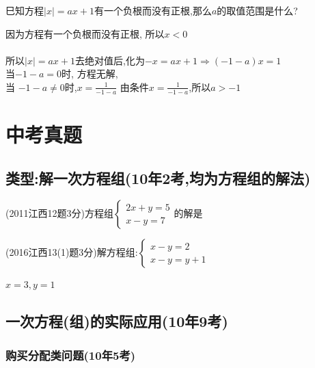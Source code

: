 \documentclass[cn,blue,12pt]{elegantbook}
\renewcommand \tkt[1]{{\CJKunderline[hidden=true, skip=true, thickness=1pt]{#1}}}
\begin{document}
\begin{liti}[resume]
\begin{solution}
\end{solution}
\item 巳知方程\(|x|=ax+1\)有一个负根而没有正根,那么\(a\)的取值范围是什么?
\begin{solution}
        因为方程有一个负根而没有正根, 所以\(x<0\)\\\\
        所以\(|x|=ax+1\)去绝对值后,化为\(-x=ax+1 \Rightarrow (-1-a)x=1\)\\
        当\(-1-a=0\)时, 方程无解,\\
        当 \(-1-a\ne 0\)时,\(x=\frac{1}{-1-a}\)
        由条件\(x=\frac{1}{-1-a}\),所以\(a>-1\)
\end{solution}
\end{liti}

\section{中考真题}%

\subsection{类型:解一次方程组(10年2考,均为方程组的解法)}%
\begin{zhenti}[resume]
\item  (2011江西12题3分)方程组\(\begin{cases} 2x+y=5\\ x-y=7\end{cases}\)的解是\tkt{\(\begin{cases} x=4\\ y=-3\end{cases}\)}
\item  (2016江西13(1)题3分)解方程组:\(\begin{cases} x-y=2\\ x-y=y+1\end{cases}\)
\begin{solution}
        \(x=3,y=1\)
\end{solution}
\end{zhenti}

\subsection{一次方程(组)的实际应用(10年9考)}%
\subsubsection{购买分配类问题(10年5考)}%
\end{document}
